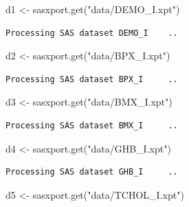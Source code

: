 \documentclass[
  letterpaper,
  DIV=11,
  numbers=noendperiod]{scrartcl}
\newenvironment{Shaded}{\begin{snugshade}}{\end{snugshade}}
\newcommand{\FunctionTok}[1]{\textcolor[rgb]{0.28,0.35,0.67}{#1}}
\newcommand{\NormalTok}[1]{\textcolor[rgb]{0.00,0.23,0.31}{#1}}
\newcommand{\OtherTok}[1]{\textcolor[rgb]{0.00,0.23,0.31}{#1}}
\newcommand{\StringTok}[1]{\textcolor[rgb]{0.13,0.47,0.30}{#1}}
\begin{document}
\begin{Shaded}
\begin{Highlighting}[]
\NormalTok{d1 }\OtherTok{\textless{}{-}} \FunctionTok{sasxport.get}\NormalTok{(}\StringTok{"data/DEMO\_I.xpt"}\NormalTok{)}
\end{Highlighting}
\end{Shaded}

\begin{verbatim}
Processing SAS dataset DEMO_I    ..
\end{verbatim}

\begin{Shaded}
\begin{Highlighting}[]
\NormalTok{d2 }\OtherTok{\textless{}{-}} \FunctionTok{sasxport.get}\NormalTok{(}\StringTok{"data/BPX\_I.xpt"}\NormalTok{)}
\end{Highlighting}
\end{Shaded}

\begin{verbatim}
Processing SAS dataset BPX_I     ..
\end{verbatim}

\begin{Shaded}
\begin{Highlighting}[]
\NormalTok{d3 }\OtherTok{\textless{}{-}} \FunctionTok{sasxport.get}\NormalTok{(}\StringTok{"data/BMX\_I.xpt"}\NormalTok{)}
\end{Highlighting}
\end{Shaded}

\begin{verbatim}
Processing SAS dataset BMX_I     ..
\end{verbatim}

\begin{Shaded}
\begin{Highlighting}[]
\NormalTok{d4 }\OtherTok{\textless{}{-}} \FunctionTok{sasxport.get}\NormalTok{(}\StringTok{"data/GHB\_I.xpt"}\NormalTok{)}
\end{Highlighting}
\end{Shaded}

\begin{verbatim}
Processing SAS dataset GHB_I     ..
\end{verbatim}

\begin{Shaded}
\begin{Highlighting}[]
\NormalTok{d5 }\OtherTok{\textless{}{-}} \FunctionTok{sasxport.get}\NormalTok{(}\StringTok{"data/TCHOL\_I.xpt"}\NormalTok{)}
\end{Highlighting}
\end{Shaded}
\end{document}
